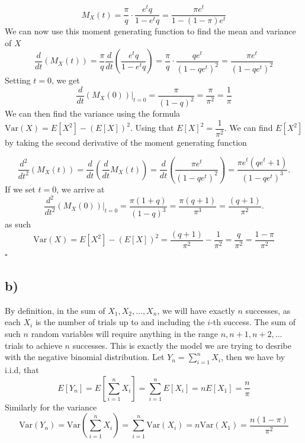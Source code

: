 \documentclass{article}
\theoremstyle{definition}
\theoremstyle{remark}
\begin{document}
\begin{equation}
    M_X(t) = \dfrac{\pi}{q} \cdot \dfrac{e^tq}{1 - e^t q}  = \dfrac{\pi e^t}{1 - (1 - \pi)e^t}
\end{equation}
We can now use this moment generating function to find the mean and variance of $X$
\begin{equation}
    \dfrac{d}{dt}(M_X(t)) = \dfrac{\pi}{q}  \dfrac{d}{dt}\left( \dfrac{e^tq}{1 - e^t q} \right) = \dfrac{\pi}{q} \cdot \dfrac{qe^t}{(1 - qe^t)^2} = \dfrac{\pi e^t}{(1 - qe^t)^2}
\end{equation}
Setting $t=0$, we get
\begin{equation}
    \dfrac{d}{dt}(M_X(0))\bigg |_{t=0} = \dfrac{\pi}{(1 - q)^2} = \dfrac{\pi}{\pi^2} = \dfrac{1}{\pi}
\end{equation}
We can then find the variance using the formula $\text{Var}(X) = E[X^2] - (E[X])^2$. Using that $E[X]^2 = \dfrac{1}{\pi^2}$. We can find $E[X^2]$ by taking the second derivative of the moment generating function

\begin{equation}
    \dfrac{d^2}{dt^2}(M_X(t)) = \dfrac{d}{dt}\left( \dfrac{d}{dt}M_X(t) \right) = \dfrac{d}{dt}\left( \dfrac{\pi e^t}{(1 - qe^t)^2} \right) = \dfrac{\pi e^t(qe^t + 1)}{(1-qe^t)^3}.
\end{equation}
If we set $t=0$, we arrive at
\begin{equation}
    \dfrac{d^2}{dt^2}(M_X(0))\bigg |_{t=0} = \dfrac{\pi(1 + q)}{(1-q)^3} = \dfrac{\pi(q +1)}{\pi^3} = \dfrac{(q +1)}{\pi^2}.
\end{equation}
as such
\begin{equation}
    \text{Var}(X) = E[X^2] - (E[X])^2 = \dfrac{(q +1)}{\pi^2} - \dfrac{1}{\pi^2} = \dfrac{q}{\pi^2} = \dfrac{1 - \pi}{\pi^2}
\end{equation}
$\square$


\subsection*{b)}
By definition, in the sum of $X_1, X_2, \ldots, X_n$, we will have exactly $n$ successes, as each $X_i$ is the number of trials up to and including the $i$-th success. The sum of such $n$ random variables will require anything in the range $n, n+1, n+2, \ldots$ trials to achieve $n$ successes. This is exactly the model we are trying to desribe with the negative binomial distribution. \vspace{1em}
Let $Y_n = \sum_{i=1}^{n} X_i$, then we have by i.i.d, that
\begin{equation}
    E[Y_n] = E[\sum_{i=1}^{n} X_i] = \sum_{i=1}^{n} E[X_i] = nE[X_1] = \dfrac{n}{\pi}
\end{equation}
Similarly for the variance
\begin{equation}
    \text{Var}(Y_n) = \text{Var}(\sum_{i=1}^{n} X_i) = \sum_{i=1}^{n} \text{Var}(X_i) = n\text{Var}(X_1) = \dfrac{n(1 - \pi)}{\pi^2}
\end{equation}
\end{document}
